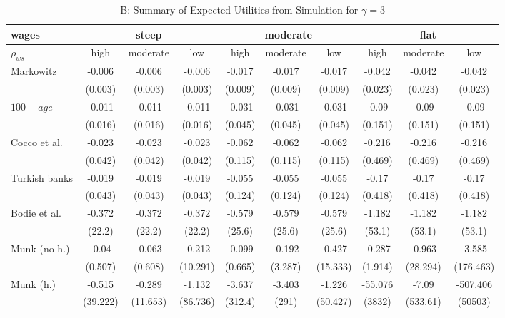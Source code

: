 \begin{table}[h!]\ContinuedFloat
	\centering
	\caption{B: Summary of Expected Utilities from Simulation for $\gamma=3$}
	\label{table:util}
	\begin{tabular}[c]{|l|ccc|ccc|ccc|}
		\hline
		 wages& \multicolumn{3}{c|}{steep} & \multicolumn{3}{c|}{moderate} & \multicolumn{3}{c|}{flat}\\
		\hline
		$\rho_{ws}$&high&moderate&low&high&moderate&low&high&moderate&low\\
		\hline
Markowitz					&-0.006&-0.006&-0.006&-0.017&-0.017&-0.017&-0.042&-0.042&-0.042\\
							&(0.003)&(0.003)&(0.003)&(0.009)&(0.009)&(0.009)&(0.023)&(0.023)&(0.023)\\
$100-age$					&-0.011&-0.011&-0.011&-0.031&-0.031&-0.031&-0.09&-0.09&-0.09\\
							&(0.016)&(0.016)&(0.016)&(0.045)&(0.045)&(0.045)&(0.151)&(0.151)&(0.151)\\
Cocco et al.				&-0.023&-0.023&-0.023&-0.062&-0.062&-0.062&-0.216&-0.216&-0.216\\
							&(0.042)&(0.042)&(0.042)&(0.115)&(0.115)&(0.115)&(0.469)&(0.469)&(0.469)\\
Turkish banks			 	&-0.019&-0.019&-0.019&-0.055&-0.055&-0.055&-0.17&-0.17&-0.17\\
							&(0.043)&(0.043)&(0.043)&(0.124)&(0.124)&(0.124)&(0.418)&(0.418)&(0.418)\\
Bodie et al.			 	&-0.372&-0.372&-0.372&-0.579&-0.579&-0.579&-1.182&-1.182&-1.182\\
							&(22.2)&(22.2)&(22.2)&(25.6)&(25.6)&(25.6)&(53.1)&(53.1)&(53.1)\\
Munk (no h.)				&-0.04&-0.063&-0.212&-0.099&-0.192&-0.427&-0.287&-0.963&-3.585\\
							&(0.507)&(0.608)&(10.291)&(0.665)&(3.287)&(15.333)&(1.914)&(28.294)&(176.463)\\
Munk (h.)					&-0.515&-0.289&-1.132&-3.637&-3.403&-1.226&-55.076&-7.09&-507.406\\
							&(39.222)&(11.653)&(86.736)&(312.4)&(291)&(50.427)&(3832)&(533.61)&(50503)\\
	\hline
	\end{tabular}
\end{table}
